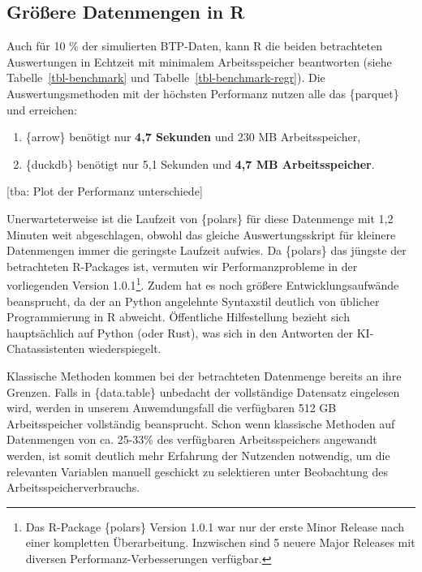 \documentclass[
  german,
  10pt,
  twoside]{article}
\providecommand{\tightlist}{%
  \setlength{\itemsep}{0pt}\setlength{\parskip}{0pt}}
\let\oldref\ref
\renewcommand{\ref}[1]{\oldref{#1}\raisebox{-0.2ex}{\scriptsize\color{wistaBlue}\ding{247}}}
\begin{document}
\clearpage

\subsection{Größere Datenmengen in
R}\label{gruxf6uxdfere-datenmengen-in-r}

Auch für 10 \% der simulierten BTP-Daten, kann R die beiden betrachteten
Auswertungen in Echtzeit mit minimalem Arbeitsspeicher beantworten
(siehe Tabelle~\ref{tbl-benchmark} und
Tabelle~\ref{tbl-benchmark-regr}). Die Auswertungsmethoden mit der
höchsten Performanz nutzen alle das \{parquet\} und erreichen:

\begin{enumerate}
\def\labelenumi{\arabic{enumi}.}
\tightlist
\item
  \{arrow\} benötigt nur \textbf{4,7 Sekunden} und 230 MB
  Arbeitsspeicher,
\item
  \{duckdb\} benötigt nur 5,1 Sekunden und \textbf{4,7 MB
  Arbeitsspeicher}.
\end{enumerate}

{[}tba: Plot der Performanz unterschiede{]}

Unerwarteterweise ist die Laufzeit von \{polars\} für diese Datenmenge
mit 1,2 Minuten weit abgeschlagen, obwohl das gleiche Auswertungsskript
für kleinere Datenmengen immer die geringste Laufzeit aufwies. Da
\{polars\} das jüngste der betrachteten R-Packages ist, vermuten wir
Performanzprobleme in der vorliegenden Version 1.0.1\footnote{Das
  R-Package \{polars\} Version 1.0.1 war nur der erste Minor Release
  nach einer kompletten Überarbeitung. Inzwischen sind 5 neuere Major
  Releases mit diversen Performanz-Verbesserungen verfügbar.}. Zudem hat
es noch größere Entwicklungsaufwände beansprucht, da der an Python
angelehnte Syntaxstil deutlich von üblicher Programmierung in R
abweicht. Öffentliche Hilfestellung bezieht sich hauptsächlich auf
Python (oder Rust), was sich in den Antworten der KI-Chatassistenten
wiederspiegelt.

Klassische Methoden kommen bei der betrachteten Datenmenge bereits an
ihre Grenzen. Falls in \{data.table\} unbedacht der vollständige
Datensatz eingelesen wird, werden in unserem Anwemdungsfall die
verfügbaren 512 GB Arbeitsspeicher vollständig beansprucht. Schon wenn
klassische Methoden auf Datenmengen von ca. 25-33\% des verfügbaren
Arbeitsspeichers angewandt werden, ist somit deutlich mehr Erfahrung der
Nutzenden notwendig, um die relevanten Variablen manuell geschickt zu
selektieren unter Beobachtung des Arbeitsspeicherverbrauchs.
\end{document}
